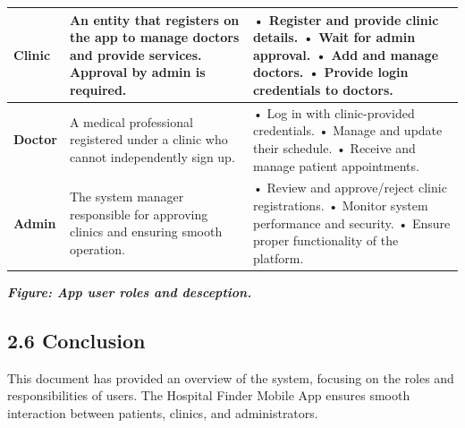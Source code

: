 \documentclass[12pt]{report}
\begin{document}
\begin{longtable}{|p{3cm}|p{6cm}|p{6cm}|}
	\hspace*{0.9cm}\textbf{Clinic}                                                                             &
	An entity that registers on the app to manage doctors and provide services. Approval by admin is required. &
	• Register and provide clinic details.\newline
	• Wait for admin approval.\newline
	• Add and manage doctors.\newline
	• Provide login credentials to doctors.                                                                                                                                                                                               \\
	\hline


	\hspace*{0.85cm}\textbf{Doctor}                                                                            & A medical professional registered under a clinic who cannot independently sign up.  &
	• Log in with clinic-provided credentials.\newline
	• Manage and update their schedule.\newline
	• Receive and manage patient appointments.                                                                                                                                                                                            \\
	\hline

	\hspace*{0.85cm}\textbf{Admin}                                                                             & The system manager responsible for approving clinics and ensuring smooth operation. &
	• Review and approve/reject clinic registrations.\newline
	• Monitor system performance and security.\newline
	• Ensure proper functionality of the platform.                                                                                                                                                                                        \\
	\hline
\end{longtable}
\begin{center}
	\textit{\textbf{Figure: App user roles and desception.}}
\end{center}


\subsection*{2.6 Conclusion}
This document has provided an overview of the system, focusing on the roles and responsibilities of users. The Hospital Finder Mobile App ensures smooth interaction between patients, clinics, and administrators.
\vspace{0.5cm}
\end{document}
